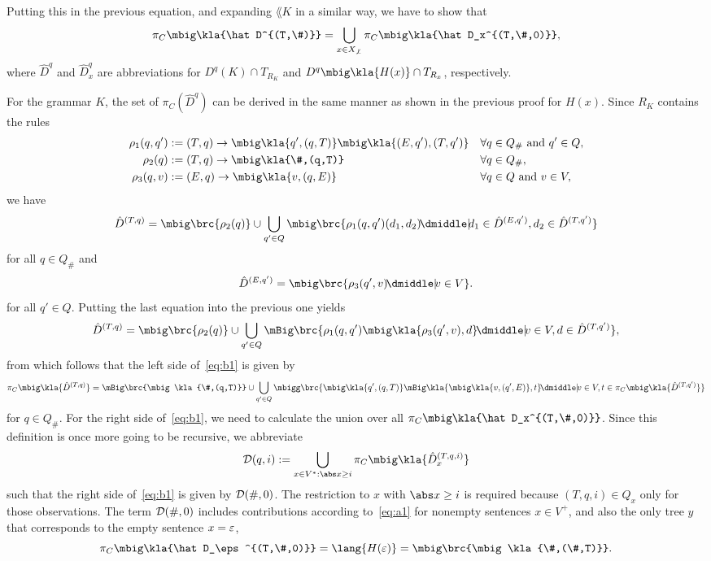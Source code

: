 Putting this in the previous equation, and expanding $\lang K$ in a similar way, we have to show that
\begin{equation}
 \label{eq:b1}
 \pi_C\mbig\kla{\hat D^{(T,\#)}} = \bigcup_{x\in X_{\not\bot}} \pi_C\mbig\kla{\hat D_x^{(T,\#,0)}},
\end{equation}
where $\hat D^q$ and $\hat D_x^q$ are abbreviations for $D^q(K)\cap T_{R_K}$
and $D^q\mbig\kla{H(x)}\cap T_{R_x}$, respectively.

For the grammar $K$, the set of $\pi_C(\hat D^q)$ can be derived in the same
manner as shown in the previous proof for $H(x)$. Since $R_K$ contains the rules
\begin{align*}
 \rho_1(q,q') &:= (T,q) \to \mbig\kla{q',(q,T)}\mbig\kla{(E,q'),(T,q')} &&\forall q\in Q_\# \text{ and } q'\in Q, \\
 \rho_2(q) &:= (T,q) \to \mbig\kla{\#,(q,T)} &&\forall q\in Q_\#, \\
 \rho_3(q,v) &:= (E,q) \to \mbig\kla{v,(q,E)} &&\forall q\in Q \text{ and } v\in V,
\end{align*}
we have
\[
 \hat D^{(T,q)} = \mbig\brc{\rho_2(q)} \cup \bigcup_{q'\in Q} \mbig\brc{\rho_1(q,q')(d_1,d_2) \!\dmiddle|\! d_1\in\hat D^{(E,q')}, d_2\in\hat D^{(T,q')}}
\]
for all $q\in Q_\#$ and
\[
 \hat D^{(E,q')} = \mbig\brc{\rho_3(q',v) \!\dmiddle|\! v\in V}.
\]
for all $q'\in Q$. Putting the last equation into the previous one yields
\[
 \hat D^{(T,q)} = \mbig\brc{\rho_2(q)} \cup \bigcup_{q'\in Q} \mBig\brc{\rho_1(q,q')\mbig\kla{\rho_3(q',v),d} \!\dmiddle|\! v\in V, d\in\hat D^{(T,q')}},
\]
from which follows that the left side of~\eqref{eq:b1} is given by
\[
 \pi_C\mbig\kla{\hat D^{(T,q)}} = \mBig\brc{\mbig\kla{\#,(q,T)}} \cup \bigcup_{q'\in Q} \mbigg\brc{\mbig\kla{q',(q,T)}\mBig\kla{\mbig\kla{v,(q',E)},t} \!\dmiddle|\! v\in V, t\in\pi_C\mbig\kla{\hat D^{(T,q')}}}
\]
for $q\in Q_\#$. For the right side of~\eqref{eq:b1}, we need to calculate the union over all $\pi_C\mbig\kla{\hat D_x^{(T,\#,0)}}$. Since this definition is once more going to be recursive, we abbreviate
\[
 \ud(q,i) := \bigcup_{x\in V^*: \abs x\geq i} \pi_C\mbig\kla{\hat D_x^{(T,q,i)}}
\]
such that the right side of~\eqref{eq:b1} is given by $\mathcal D(\#,0)$. The
restriction to $x$ with $\abs x\geq i$ is required because $(T,q,i)\in Q_x$
only for those observations. The term $\mathcal D(\#,0)$ includes contributions
according to~\eqref{eq:a1} for nonempty sentences $x\in V^+$, and also the only
tree $y$ that corresponds to the empty sentence $x=\varepsilon$,
\[
 \pi_C\mbig\kla{\hat D_\eps^{(T,\#,0)}} = \lang{H(\eps)} = \mbig\brc{\mbig\kla{\#,(\#,T)}}.
\]

